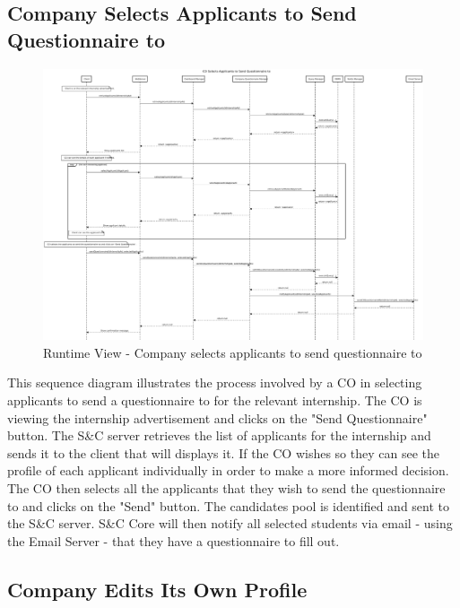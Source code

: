 
\subsection{Company Selects Applicants to Send Questionnaire to}
\label{sub:company-selects-applicants-to-send-questionnaire-to}%

\begin{figure}[H]
      \centering
      \includegraphics[width=1.0\textwidth]{Images/RV_08.pdf}
      \caption{Runtime View - Company selects applicants to send questionnaire to}
      \label{fig:rv-co-selects-applicants}
\end{figure}

\par This sequence diagram illustrates the process involved by a CO in selecting applicants to send a questionnaire to
for the relevant internship. The CO is viewing the internship advertisement and clicks on the "Send Questionnaire"
button. The S\&C server retrieves the list of applicants for the internship and sends it to the client that will
displays it. If the CO wishes so they can see the profile of each applicant individually in order to make a more
informed decision. The CO then selects all the applicants that they wish to send the questionnaire to and clicks on
the "Send" button. The candidates pool is identified and sent to the S\&C server. S\&C Core will then notify all
selected students via email - using the Email Server - that they have a questionnaire to fill out.


\subsection{Company Edits Its Own Profile}
\label{sub:company-edits-its-own-profile}%

